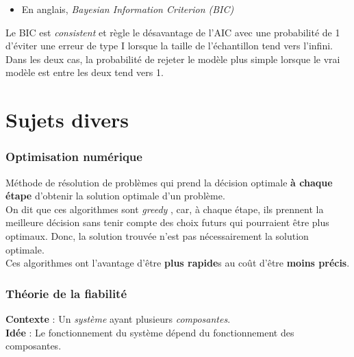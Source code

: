 \documentclass[10pt, french]{article}
\begin{document}
\begin{multicols*}{2}
\begin{definitionNOHFILLsub}
\begin{itemize}
	\item	En anglais, \og \textit{Bayesian Information Criterion (BIC)} \fg{}
\end{itemize}
\end{definitionNOHFILLsub}

Le BIC est \og \textit{consistent} \fg{} et règle le désavantage de l'AIC avec une probabilité de 1 d'éviter une erreur de type I lorsque la taille de l'échantillon tend vers l'infini. \\

Dans les deux cas, la probabilité de rejeter le modèle plus simple lorsque le vrai modèle est entre les deux tend vers 1. 





\newpage
\part{Sujets divers}
\label{chapt:varia}
\section{Optimisation numérique}
\begin{definitionNOHFILLsub}
Méthode de résolution de problèmes qui prend la décision optimale \textbf{à chaque étape} d'obtenir la solution optimale d'un problème. \\

On dit que ces algorithmes sont \og \textit{greedy} \fg{}, car, à chaque étape, ils prennent la meilleure décision sans tenir compte des choix futurs qui pourraient être plus optimaux. Donc, la solution trouvée n'est pas nécessairement la solution optimale. \\

Ces algorithmes ont l'avantage d'être \textbf{plus rapide}s au coût d'être \textbf{moins précis}.
\end{definitionNOHFILLsub}





\newpage
\section{Théorie de la fiabilité}
\label{sec:reliability}
\begin{definitionNOHFILL}
\textbf{Contexte} : Un \textit{système} ayant plusieurs \textit{composantes}.	 \\
\textbf{Idée} : Le fonctionnement du système dépend du fonctionnement des composantes.


\end{definitionNOHFILL}
\end{multicols*}
\end{document}

